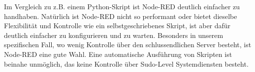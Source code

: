 Im Vergleich zu z.B. einem Python-Skript ist Node-RED deutlich einfacher zu handhaben.
Natürlich ist Node-RED nicht so performant oder bietet dieselbe Flexibilität und Kontrolle wie ein selbstgeschriebenes Skript,
ist aber dafür deutlich einfacher zu konfigurieren und zu warten.
Besonders in unserem spezifischen Fall, wo wenig Kontrolle über den schlussendlichen Server besteht, ist Node-RED eine gute Wahl.
Eine automatische Ausführung von Skripten ist beinahe unmöglich, das keine Kontrolle über Sudo-Level Systemdiensten besteht.